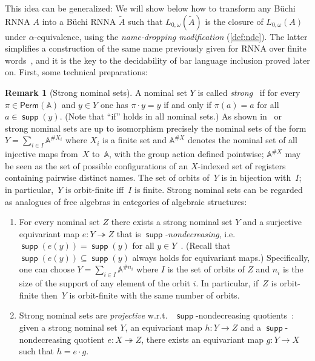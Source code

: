 \documentclass[10pt,a4paper]{amsart}
\renewcommand{\o}{\cdot}
\numberwithin{equation}{section}
\newcommand{\epito}{\twoheadrightarrow}
\newcommand{\seq}{\subseteq}
\newcommand{\tl}{\widetilde}
\newcommand{\Perm}{\mathsf{Perm}}
\newcommand{\+}[1]{\mathcal{#1}\xspace}
\newcommand{\names}{\mathbb{A}}
\DeclareMathOperator{\supp}{\mathsf{supp}} %
\theoremstyle{definition}
\newtheorem{rem}[theorem]{Remark}
\begin{document}
This idea can be generalized: We will show below how to transform any
Büchi RNNA $A$ into a Büchi RNNA $\tl{A}$ such that
$L_{0,\omega}(\tl{A})$ is the closure of $L_{0,\omega}(A)$ under
$\alpha$-equivalence, using the \emph{name-dropping modification}
(\autoref{def:ndc}). The latter simplifies a construction of the same
name previously given for RNNA over finite words~\cite{SchroderEA17},
and it is the key to the decidability of bar language inclusion proved
later on. First, some technical preparations:
%
\begin{rem}[Strong nominal sets]\label{rem:strong-nominal-sets}
  A nominal set $Y$ is called \emph{strong}~\cite{tzevelekos08} if for
  every $\pi\in \Perm(\names)$ and $y\in Y$ one has $\pi\o y = y$ if
  and only if $\pi(a)=a$ for all $a\in \supp(y)$. (Note that ``if''
  holds in all nominal sets.) As shown
  in~\cite[Lem.~2.4.2]{petrisan11} or~\cite[Cor.~B.27(2)]{mu19} strong
  nominal sets are up to isomorphism precisely the nominal sets of the
  form $Y=\sum_{i\in I} \names^{\# X_i}$ where $X_i$ is a finite set
  and $\names^{\# X}$ denotes the nominal set of all injective maps
  from~$X$ to~$\names$, with the group action defined pointwise;
  $\names^{\# X}$ may be seen as the set of possible configurations of
  an $X$-indexed set of registers containing pairwise distinct
  names. The set of orbits of~$Y$ is in bijection with~$I$; in
  particular,~$Y$ is orbit-finite iff~$I$ is finite. Strong nominal
  sets can be regarded as analogues of free algebras in categories of
  algebraic structures:
  \begin{enumerate}
  \item For every nominal set $Z$ there exists a strong nominal set $Y$ and a surjective equivariant map $e\colon Y\epito Z$ that is
    \emph{$\supp$-nondecreasing}, i.e.~$\supp(e(y))=\supp(y)$ for all
    $y\in Y$~\cite[Cor.~B.27.1]{mu19}. (Recall that
    $\supp(e(y))\seq \supp(y)$ always holds for equivariant maps.)
    Specifically, one can choose $Y=\sum_{i\in I} \names^{\# n_i}$
    where $I$ is the set of orbits of $Z$ and $n_i$ is the size of the
    support of any element of the orbit $i$. In particular, if~$Z$ is
    orbit-finite then~$Y$ is orbit-finite with the same number of
    orbits.
  
  \item Strong nominal sets are \emph{projective} w.r.t.~%
    $\supp$-nondecreasing quotients~\cite[Lem.~B.28]{mu19}: given a
    strong nominal set $Y$, an equivariant map $h\colon Y\to Z$ and a
    $\supp$-nondecreasing quotient $e\colon X\epito Z$,
    there exists an equivariant map $g\colon Y\to X$ such that
    $h=e\o g$.
  \end{enumerate}
\end{rem}
\end{document}
